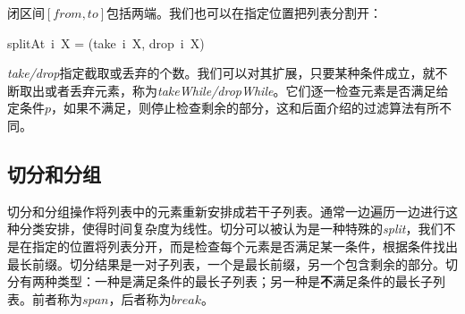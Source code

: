 \documentclass[b5paper]{ctexart}
\begin{document}
闭区间$[from, to]$包括两端。我们也可以在指定位置把列表分割开：

\be
splitAt\ i\ X = (take\ i\ X, drop\ i\ X)
\label{eq:split-at}
\ee

 
\textit{take/drop}指定截取或丢弃的个数。我们可以对其扩展，只要某种条件成立，就不断取出或者丢弃元素，称为\textit{takeWhile/dropWhile}。它们逐一检查元素是否满足给定条件$p$，如果不满足，则停止检查剩余的部分，这和后面介绍的过滤算法有所不同。

\be
{}
\ee

\begin{Exercise}
\end{Exercise}

\subsection{切分和分组}
  

切分和分组操作将列表中的元素重新安排成若干子列表。通常一边遍历一边进行这种分类安排，使得时间复杂度为线性。切分可以被认为是一种特殊的\textit{split}，我们不是在指定的位置将列表分开，而是检查每个元素是否满足某一条件，根据条件找出最长前缀。切分结果是一对子列表，一个是最长前缀，另一个包含剩余的部分。切分有两种类型：一种是满足条件的最长子列表；另一种是\textbf{不}满足条件的最长子列表。前者称为$span$，后者称为$break$。
\end{document}
